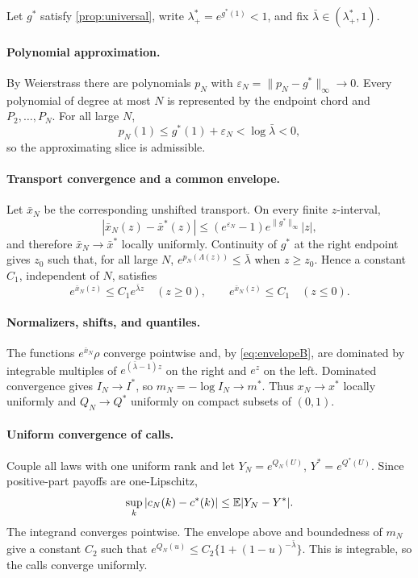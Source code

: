 Let $g^*$ satisfy \cref{prop:universal}, write
$\lambda_+^*=e^{g^*(1)}<1$, and fix
$\bar\lambda\in(\lambda_+^*,1)$.

\paragraph{Polynomial approximation.}
By Weierstrass there are polynomials $p_N$ with
$\varepsilon_N=\|p_N-g^*\|_\infty\to0$.  Every polynomial of degree at most
$N$ is represented by the endpoint chord and $P_2,\ldots,P_N$.  For all
large $N$,
\[
p_N(1)\le g^*(1)+\varepsilon_N<\log\bar\lambda<0,
\]
so the approximating slice is admissible.

\paragraph{Transport convergence and a common envelope.}
Let $\bar x_N$ be the corresponding unshifted transport.  On every finite
$z$-interval,
\[
|\bar x_N(z)-\bar x^*(z)|
\le(e^{\varepsilon_N}-1)e^{\|g^*\|_\infty}|z|,
\]
and therefore $\bar x_N\to\bar x^*$ locally uniformly.  Continuity of $g^*$
at the right endpoint gives $z_0$ such that, for all large $N$,
$e^{p_N(\Lambda(z))}\le\bar\lambda$ when $z\ge z_0$.  Hence a constant
$C_1$, independent of $N$, satisfies
\begin{equation}
e^{\bar x_N(z)}\le C_1e^{\bar\lambda z}\quad(z\ge0),
\qquad
e^{\bar x_N(z)}\le C_1\quad(z\le0).
\label{eq:envelopeB}
\end{equation}

\paragraph{Normalizers, shifts, and quantiles.}
The functions $e^{\bar x_N}\rho$ converge pointwise and, by
\eqref{eq:envelopeB}, are dominated by integrable multiples of
$e^{(\bar\lambda-1)z}$ on the right and $e^z$ on the left.  Dominated
convergence gives $I_N\to I^*$, so $m_N=-\log I_N\to m^*$.  Thus
$x_N\to x^*$ locally uniformly and $Q_N\to Q^*$ uniformly on compact
subsets of $(0,1)$.

\paragraph{Uniform convergence of calls.}
Couple all laws with one uniform rank and let
$Y_N=e^{Q_N(U)}$, $Y^*=e^{Q^*(U)}$.  Since positive-part payoffs are
one-Lipschitz,
\[
\sup_k|c_N(k)-c^*(k)|\le\mathbb{E}|Y_N-Y^*|.
\]
The integrand converges pointwise.  The envelope above and boundedness of
$m_N$ give a constant $C_2$ such that
$e^{Q_N(u)}\le C_2\{1+(1-u)^{-\bar\lambda}\}$.  This is integrable, so the
calls converge uniformly.

